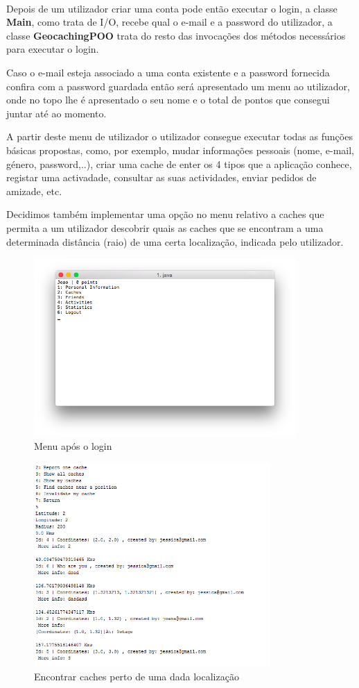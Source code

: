 \documentclass{article}
\begin{document}
\\
\par Depois de um utilizador criar uma conta pode então executar o login, a classe \textbf{Main}, como trata de I/O, recebe qual
o e-mail e a password do utilizador, a classe \textbf{GeocachingPOO} trata do resto das invocações dos métodos necessários
para executar o login.
\par Caso o e-mail esteja associado a uma conta existente e a password fornecida confira com a password guardada então
será apresentado um menu ao utilizador, onde no topo lhe é apresentado o seu nome e o total de pontos que consegui juntar
até ao momento.
\par A partir deste menu de utilizador o utilizador consegue executar todas as funções básicas propostas, como, por exemplo,
mudar informações pessoais (nome, e-mail, género, password,..), criar uma cache de enter os 4 tipos que a aplicação
conhece, registar uma activadade, consultar as suas actividades, enviar pedidos de amizade, etc.
\par Decidimos também implementar uma opção no menu relativo a caches que permita a um utilizador descobrir quais as 
caches que se encontram a uma determinada distância (raio) de uma certa localização, indicada pelo utilizador. \\
\begin{figure}[ht!]
\centering
\includegraphics[width=100mm]{login.png}
\caption{Menu após o login}

\end{figure}
\begin{figure}[ht!]
\centering
\includegraphics[width=90mm]{getNearCaches.png}
\caption{Encontrar caches perto de uma dada localização}
\end{figure}
\newpage
\end{document}
